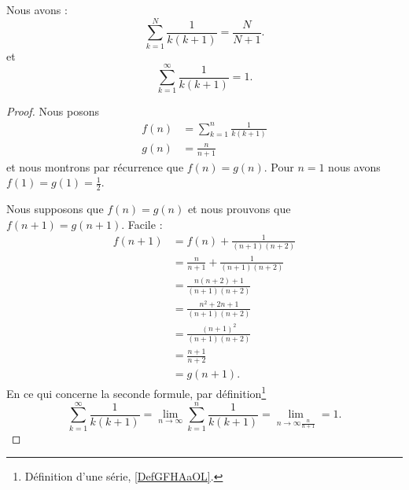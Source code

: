 \begin{lemma}     \label{LEMooKDHPooPlFTIT}
    Nous avons :
    \begin{equation}
        \sum_{k=1}^N\frac{1}{ k(k+1) }=\frac{ N }{ N+1 }.
    \end{equation}
    et
    \begin{equation}
        \sum_{k=1}^{\infty}\frac{1}{ k(k+1) }=1.
    \end{equation}
\end{lemma}

\begin{proof}
    Nous posons
    \begin{subequations}
        \begin{align}
            f(n)&=\sum_{k=1}^n\frac{1}{ k(k+1) }\\
            g(n)&=\frac{ n }{ n+1 }
        \end{align}
    \end{subequations}
    et nous montrons par récurrence que \( f(n)=g(n)\). Pour \( n=1\) nous avons \( f(1)=g(1)=\frac{ 1 }{2}\).

    Nous supposons que \( f(n)=g(n)\) et nous prouvons que \( f(n+1)=g(n+1)\). Facile :
    \begin{subequations}
        \begin{align}
            f(n+1)&=f(n)+\frac{1}{ (n+1)(n+2) }\\
            &=\frac{ n }{ n+1 }+\frac{1}{ (n+1)(n+2) }\\
            &=\frac{ n(n+2)+1 }{ (n+1)(n+2) }\\
            &=\frac{ n^2+2n+1 }{ (n+1)(n+2) }\\
            &=\frac{ (n+1)^2 }{ (n+1)(n+2) }\\
            &=\frac{ n+1 }{ n+2 }\\
            &=g(n+1).
        \end{align}
    \end{subequations}
    En ce qui concerne la seconde formule, par définition\footnote{Définition d'une série, \ref{DefGFHAaOL}.}
    \begin{equation}
        \sum_{k=1}^{\infty}\frac{1}{ k(k+1) }=\lim_{n\to \infty} \sum_{k=1}^n\frac{1}{ k(k+1) }=\lim_{n\to \infty\frac{ n }{ n+1 }} =1.
    \end{equation}
\end{proof}

